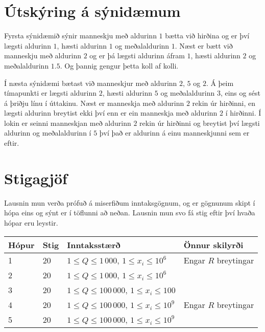 \section*{Útskýring á sýnidæmum}
Fyrsta sýnidæmið sýnir manneskju með aldurinn $1$ bætta við hirðina og er því
lægsti aldurinn $1$, hæsti aldurinn $1$ og meðalaldurinn $1$. Næst er bætt við
manneskju með aldurinn $2$ og er þá lægsti aldurinn áfram $1$, hæsti aldurinn $2$
og meðalaldurinn $1.5$. Og þannig gengur þetta koll af kolli.

Í næsta sýnidæmi bætast við manneskjur með aldurinn $2$, $5$ og $2$. Á þeim
tímapunkti er lægsti aldurinn $2$, hæsti aldurinn $5$ og meðalaldurinn $3$,
eins og sést á þriðju línu í úttakinu. Næst er manneskja með aldurinn $2$ rekin
úr hirðinni, en lægsti aldurinn breytist ekki því enn er ein manneskja með
aldurinn $2$ í hirðinni. Í lokin er seinni manneskjan með aldurinn $2$ rekin úr
hirðinni og breytist því lægsti aldurinn og meðalaldurinn í $5$ því það er
aldurinn á einu manneskjunni sem er eftir.

\section*{Stigagjöf}
Lausnin mun verða prófuð á miserfiðum inntaksgögnum, og er gögnunum skipt í
hópa eins og sýnt er í töflunni að neðan. Lausnin mun svo fá stig eftir því
hvaða hópar eru leystir.

\begin{tabular}{|l|l|l|l|}
\hline
Hópur & Stig & Inntaksstærð & Önnur skilyrði  \\ \hline
1     & 20         & $ 1 \le Q \le 1\,000$, $1 \leq x_i \leq 10^6$ & Engar $R$ breytingar \\ \hline
2     & 20         & $ 1 \le Q \le 1\,000$, $1 \leq x_i \leq 10^6$ & \\ \hline
3     & 20         & $ 1 \le Q \le 100\,000$, $1 \leq x_i \leq 100$ & \\ \hline
4     & 20         & $ 1 \le Q \le 100\,000$, $1 \leq x_i \leq 10^9$ & Engar $R$ breytingar \\ \hline
5     & 20         & $ 1 \le Q \le 100\,000$, $1 \leq x_i \leq 10^9$ & \\ \hline
\end{tabular}
